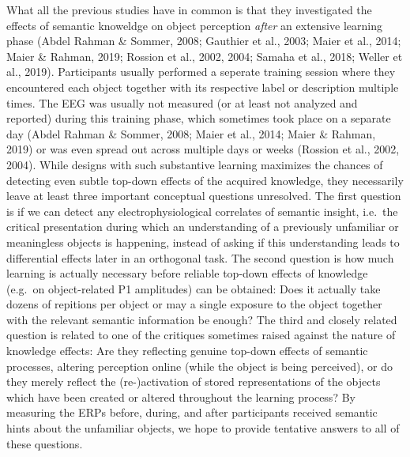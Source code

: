 \documentclass[
  english,
  man,11pt,floatsintext]{apa7}
\begin{document}
What all the previous studies have in common is that they investigated the effects of semantic knoweldge on object perception \emph{after} an extensive learning phase (Abdel Rahman \& Sommer, 2008; Gauthier et al., 2003; Maier et al., 2014; Maier \& Rahman, 2019; Rossion et al., 2002, 2004; Samaha et al., 2018; Weller et al., 2019). Participants usually performed a seperate training session where they encountered each object together with its respective label or description multiple times. The EEG was usually not measured (or at least not analyzed and reported) during this training phase, which sometimes took place on a separate day (Abdel Rahman \& Sommer, 2008; Maier et al., 2014; Maier \& Rahman, 2019) or was even spread out across multiple days or weeks (Rossion et al., 2002, 2004). While designs with such substantive learning maximizes the chances of detecting even subtle top-down effects of the acquired knowledge, they necessarily leave at least three important conceptual questions unresolved. The first question is if we can detect any electrophysiological correlates of semantic insight, i.e.~the critical presentation during which an understanding of a previously unfamiliar or meaningless objects is happening, instead of asking if this understanding leads to differential effects later in an orthogonal task. The second question is how much learning is actually necessary before reliable top-down effects of knowledge (e.g.~on object-related P1 amplitudes) can be obtained: Does it actually take dozens of repitions per object or may a single exposure to the object together with the relevant semantic information be enough? The third and closely related question is related to one of the critiques sometimes raised against the nature of knowledge effects: Are they reflecting genuine top-down effects of semantic processes, altering perception online (while the object is being perceived), or do they merely reflect the (re-)activation of stored representations of the objects which have been created or altered throughout the learning process? By measuring the ERPs before, during, and after participants received semantic hints about the unfamiliar objects, we hope to provide tentative answers to all of these questions.
\end{document}
